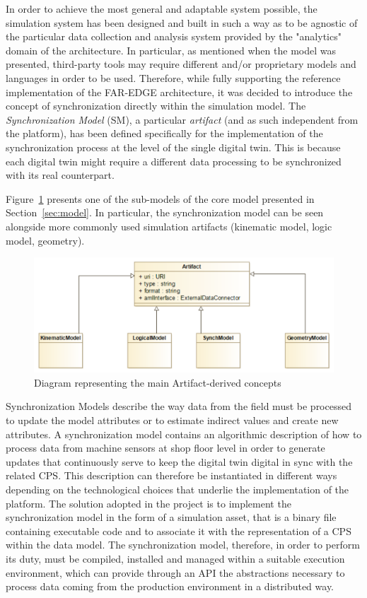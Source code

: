 In order to achieve the most general and adaptable system possible, the simulation system has been designed and built in such a way as to be agnostic of the particular data collection and analysis system provided by the "analytics" domain of the architecture. In particular, as mentioned when the model was presented, third-party tools may require different and/or proprietary models and languages in order to be used. Therefore, while fully supporting the reference implementation of the FAR-EDGE architecture, it was decided to introduce the concept of synchronization directly within the simulation model. The \textit{Synchronization Model} (SM), a particular \textit{artifact} (and as such independent from the platform), has been defined specifically for the implementation of the synchronization process at the level of the single digital twin.
This is because each digital twin might require a different data processing  to be synchronized with its real counterpart. 

Figure~\ref{fig:sm-diagram} presents one of the sub-models of the core model presented in Section~\ref{sec:model}. In particular, the synchronization model can be seen alongside more commonly used simulation artifacts (kinematic model, logic model, geometry). 


\begin{figure}
	\centering
	\includegraphics[width=0.9\linewidth]{images/sm-artifact.png}
	\caption{Diagram representing the main Artifact-derived concepts}
	\label{fig:sm-diagram}
\end{figure}

Synchronization Models describe the way data from the field must be processed to update the model attributes or to estimate indirect values and create new attributes. 
A synchronization model contains an algorithmic description of how to process data from machine sensors at shop floor level in order to generate updates that continuously serve to keep the digital twin digital in sync with the related CPS. 
This description can therefore be instantiated in different ways depending on the technological choices that underlie the implementation of the platform. 
The solution adopted in the project is to implement the synchronization model in the form of a simulation asset, that is a binary file containing executable code and to associate it with the representation of a CPS within the data model. The synchronization model, therefore, in order to perform its duty, must be compiled, installed and managed within a suitable execution environment, which can provide through an API the abstractions necessary to process data coming from the production environment in a distributed way.  


